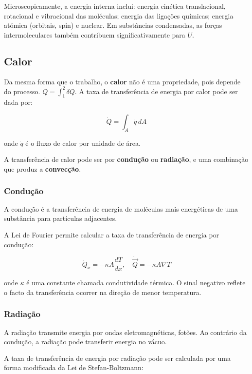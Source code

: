 Microscopicamente, a energia interna inclui: energia cinética translacional, rotacional e vibracional das moléculas; energia das ligações químicas; energia atómica (orbitais, spin) e nuclear. Em substâncias condensadas, as forças intermoleculares também contribuem significativamente para $U$.

\subsection{Calor}

Da mesma forma que o trabalho, o \textbf{calor} não é uma propriedade, pois depende do processo. $Q = \int_1^2 \delta Q$.
A taxa de transferência de energia por calor pode ser dada por:

\begin{equation*}
    \dot{Q} = \int_A \dot{q} \, dA
\end{equation*}

onde $\dot{q}$ é o fluxo de calor por unidade de área.

A transferência de calor pode ser por \textbf{condução} ou \textbf{radiação}, e uma combinação que produz a \textbf{convecção}.

\subsubsection{Condução}

A condução é a transferência de energia de moléculas mais energéticas de uma substância para partículas adjacentes.

A Lei de Fourier permite calcular a taxa de transferência de energia por condução:

\begin{equation}
    \dot{Q}_x = - \kappa A \frac{dT}{dx}, \quad \dot{\vec{Q}} = - \kappa A \nabla T
\end{equation}

onde $\kappa$ é uma constante chamada condutividade térmica. O sinal negativo reflete o facto da transferência ocorrer na direção de menor temperatura.

\subsubsection{Radiação}

A radiação transmite energia por ondas eletromagnéticas, fotões. Ao contrário da condução, a radiação pode transferir energia no vácuo.

A taxa de transferência de energia por radiação pode ser calculada por uma forma modificada da Lei de Stefan-Boltzmann:


